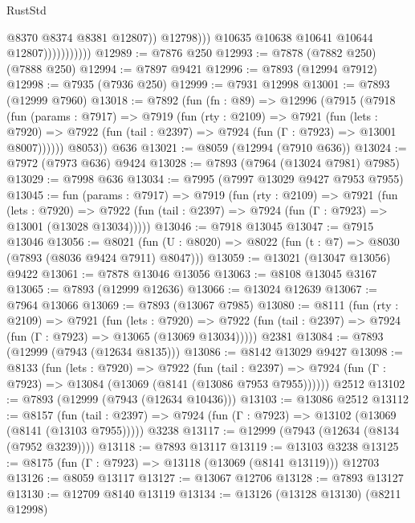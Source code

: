 \begin{lexlean}{RustStd}
\begin{coremodule}
                                    @8370
                                    @8374
                                    @8381
                                    @12807))
                                @12798)))
                          @10635
                          @10638
                          @10641
                          @10644
                          @12807)))))))))))
@12989 := @7876 @250
@12993 := @7878 (@7882 @250) (@7888 @250)
@12994 := @7897 @9421
@12996 := @7893 (@12994 @7912)
@12998 := @7935 (@7936 @250)
@12999 := @7931 @12998
@13001 := @7893 (@12999 @7960)
@13018 := @7892
    (fun (fn : @89) =>
    @12996
      (@7915
        (@7918
          (fun (params : @7917) =>
          @7919
            (fun (rty : @2109) =>
            @7921
              (fun (lets : @7920) =>
              @7922 (fun (tail : @2397) => @7924 (fun (Γ : @7923) => @13001 @8007))))))
        @8053))
    @636
@13021 := @8059 (@12994 (@7910 @636))
@13024 := @7972 (@7973 @636) @9424
@13028 := @7893 (@7964 (@13024 @7981) @7985)
@13029 := @7998 @636
@13034 := @7995 (@7997 @13029 @9427 @7953 @7955)
@13045 := fun (params : @7917) =>
  @7919
    (fun (rty : @2109) =>
    @7921
      (fun (lets : @7920) =>
      @7922 (fun (tail : @2397) => @7924 (fun (Γ : @7923) => @13001 (@13028 @13034)))))
@13046 := @7918 @13045
@13047 := @7915 @13046
@13056 := @8021 (fun (U : @8020) => @8022 (fun (t : @7) => @8030 (@7893 (@8036 @9424 @7911) @8047)))
@13059 := @13021 (@13047 @13056) @9422
@13061 := @7878 @13046 @13056
@13063 := @8108 @13045 @3167
@13065 := @7893 (@12999 @12636)
@13066 := @13024 @12639
@13067 := @7964 @13066
@13069 := @7893 (@13067 @7985)
@13080 := @8111
    (fun (rty : @2109) =>
    @7921
      (fun (lets : @7920) =>
      @7922 (fun (tail : @2397) => @7924 (fun (Γ : @7923) => @13065 (@13069 @13034)))))
    @2381
@13084 := @7893 (@12999 (@7943 (@12634 @8135)))
@13086 := @8142 @13029 @9427
@13098 := @8133
    (fun (lets : @7920) =>
    @7922
      (fun (tail : @2397) =>
      @7924 (fun (Γ : @7923) => @13084 (@13069 (@8141 (@13086 @7953 @7955))))))
    @2512
@13102 := @7893 (@12999 (@7943 (@12634 @10436)))
@13103 := @13086 @2512
@13112 := @8157
    (fun (tail : @2397) => @7924 (fun (Γ : @7923) => @13102 (@13069 (@8141 (@13103 @7955)))))
    @3238
@13117 := @12999 (@7943 (@12634 (@8134 (@7952 @3239))))
@13118 := @7893 @13117
@13119 := @13103 @3238
@13125 := @8175 (fun (Γ : @7923) => @13118 (@13069 (@8141 @13119))) @12703
@13126 := @8059 @13117
@13127 := @13067 @12706
@13128 := @7893 @13127
@13130 := @12709 @8140 @13119
@13134 := @13126 (@13128 @13130) (@8211 @12998)

\end{coremodule}
\end{lexlean}
